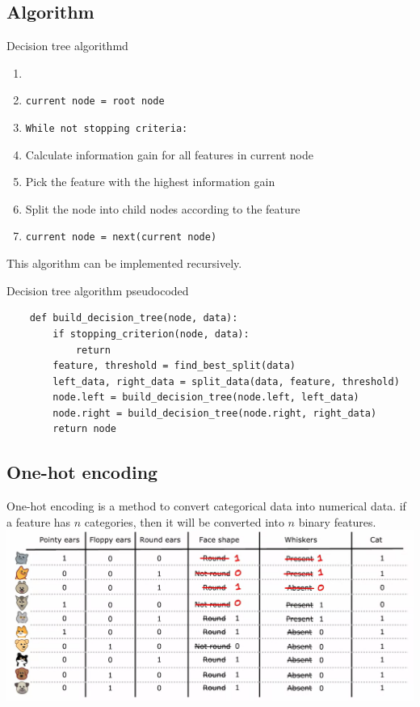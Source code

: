 \subsection*{Algorithm}
\begin{thmbox}{Decision tree algorithm}{d}
\begin{enumerate}
    \item 
    \item \texttt{current node = root node}
    \item \texttt{While not stopping criteria:}
    \item[] \quad Calculate information gain for all features in current node
    \item[] \quad Pick the feature with the highest information gain
    \item[] \quad Split the node into child nodes according to the feature
    \item[] \quad \texttt{current node = next(current node)}
\end{enumerate}
\end{thmbox}
\par
This algorithm can be implemented recursively.
\begin{thmbox}{Decision tree algorithm pseudocode}{d}
\begin{verbatim}
    def build_decision_tree(node, data):
        if stopping_criterion(node, data):
            return
        feature, threshold = find_best_split(data)
        left_data, right_data = split_data(data, feature, threshold)
        node.left = build_decision_tree(node.left, left_data)
        node.right = build_decision_tree(node.right, right_data)
        return node
\end{verbatim}
\end{thmbox}
\subsection*{One-hot encoding}
One-hot encoding is a method to convert categorical data into numerical data.
if a feature has $n$ categories, then it will be converted into $n$ binary features.\\
\includegraphics*[width=\textwidth]{images/11.8}
